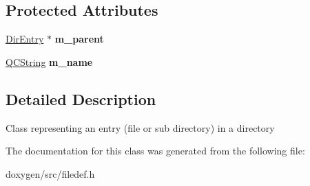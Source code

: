 \subsection*{Protected Attributes}
\begin{DoxyCompactItemize}
\item 
\mbox{\label{class_dir_entry_ac43bb4a66667c2dc67c40152b6c17975}} 
\mbox{\hyperlink{class_dir_entry}{Dir\+Entry}} $\ast$ {\bfseries m\+\_\+parent}
\item 
\mbox{\label{class_dir_entry_a6d177d497073ab12cbc88611027f62e9}} 
\mbox{\hyperlink{class_q_c_string}{Q\+C\+String}} {\bfseries m\+\_\+name}
\end{DoxyCompactItemize}


\subsection{Detailed Description}
Class representing an entry (file or sub directory) in a directory 

The documentation for this class was generated from the following file\+:\begin{DoxyCompactItemize}
\item 
doxygen/src/filedef.\+h\end{DoxyCompactItemize}
